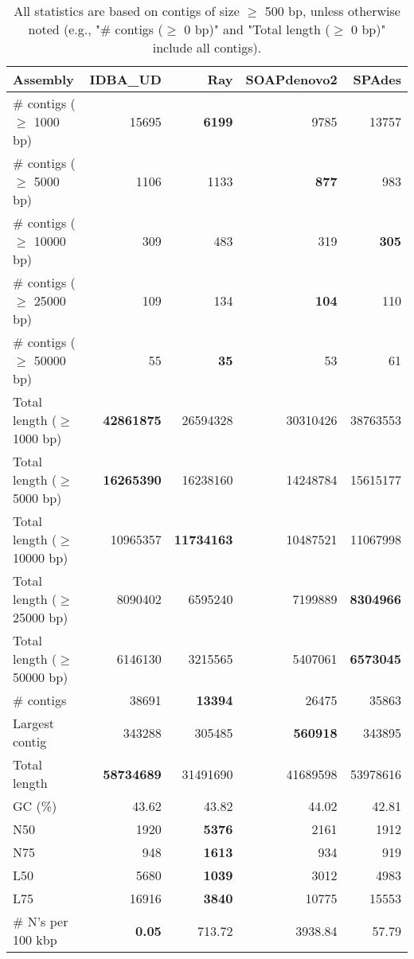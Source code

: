 \documentclass[12pt,a4paper]{article}
\begin{document}
\begin{table}[ht]
\begin{center}
\caption{All statistics are based on contigs of size $\geq$ 500 bp, unless otherwise noted (e.g., "\# contigs ($\geq$ 0 bp)" and "Total length ($\geq$ 0 bp)" include all contigs).}
\begin{tabular}{|l*{4}{|r}|}
\hline
Assembly & IDBA\_UD & Ray & SOAPdenovo2 & SPAdes \\ \hline
\# contigs ($\geq$ 1000 bp) & 15695 & {\bf 6199} & 9785 & 13757 \\ \hline
\# contigs ($\geq$ 5000 bp) & 1106 & 1133 & {\bf 877} & 983 \\ \hline
\# contigs ($\geq$ 10000 bp) & 309 & 483 & 319 & {\bf 305} \\ \hline
\# contigs ($\geq$ 25000 bp) & 109 & 134 & {\bf 104} & 110 \\ \hline
\# contigs ($\geq$ 50000 bp) & 55 & {\bf 35} & 53 & 61 \\ \hline
Total length ($\geq$ 1000 bp) & {\bf 42861875} & 26594328 & 30310426 & 38763553 \\ \hline
Total length ($\geq$ 5000 bp) & {\bf 16265390} & 16238160 & 14248784 & 15615177 \\ \hline
Total length ($\geq$ 10000 bp) & 10965357 & {\bf 11734163} & 10487521 & 11067998 \\ \hline
Total length ($\geq$ 25000 bp) & 8090402 & 6595240 & 7199889 & {\bf 8304966} \\ \hline
Total length ($\geq$ 50000 bp) & 6146130 & 3215565 & 5407061 & {\bf 6573045} \\ \hline
\# contigs & 38691 & {\bf 13394} & 26475 & 35863 \\ \hline
Largest contig & 343288 & 305485 & {\bf 560918} & 343895 \\ \hline
Total length & {\bf 58734689} & 31491690 & 41689598 & 53978616 \\ \hline
GC (\%) & 43.62 & 43.82 & 44.02 & 42.81 \\ \hline
N50 & 1920 & {\bf 5376} & 2161 & 1912 \\ \hline
N75 & 948 & {\bf 1613} & 934 & 919 \\ \hline
L50 & 5680 & {\bf 1039} & 3012 & 4983 \\ \hline
L75 & 16916 & {\bf 3840} & 10775 & 15553 \\ \hline
\# N's per 100 kbp & {\bf 0.05} & 713.72 & 3938.84 & 57.79 \\ \hline
\end{tabular}
\end{center}
\end{table}
\end{document}
